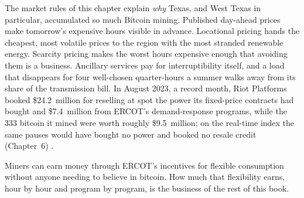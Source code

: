 The market rules of this chapter explain \emph{why} Texas, and West Texas in particular, accumulated so much Bitcoin mining. Published day-ahead prices make tomorrow's expensive hours visible in advance. Locational pricing hands the cheapest, most volatile prices to the region with the most stranded renewable energy. Scarcity pricing makes the worst hours expensive enough that avoiding them is a business. Ancillary services pay for interruptibility itself, and a load that disappears for four well-chosen quarter-hours a summer walks away from its share of the transmission bill. In August 2023, a record month, Riot Platforms booked \$24.2~million for reselling at spot the power its fixed-price contracts had bought and \$7.4~million from ERCOT's demand-response programs, while the 333 bitcoin it mined were worth roughly \$9.5~million; on the real-time index the same pauses would have bought no power and booked no resale credit (Chapter~6) \autocite{riot2023august,riot10k2024}. %

Miners can earn money through ERCOT's incentives for flexible consumption without anyone needing to believe in bitcoin. How much that flexibility earns, hour by hour and program by program, is the business of the rest of this book.
